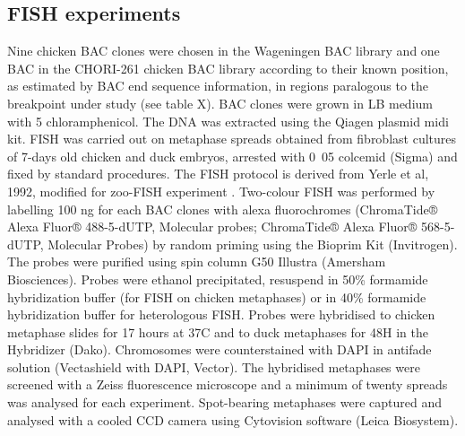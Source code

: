 \documentclass[10pt,letterpaper]{article}
\begin{document}
\subsection*{FISH experiments}

Nine chicken BAC clones were chosen in the Wageningen BAC library \cite{Crooijmans2000} and one BAC in the CHORI-261 chicken BAC library \cite{Zimmer1997} according to their known position, as estimated by BAC end sequence information, in regions paralogous to the breakpoint under study (see table X). BAC clones were grown in LB medium with \unit{5}{\micro\gram\per\milli\litre} chloramphenicol. The DNA was extracted using the Qiagen plasmid midi kit.
FISH was carried out on metaphase spreads obtained from fibroblast cultures of 7-days old chicken and duck embryos, arrested with  \unit{0.05}{\micro\gram\per\milli\litre} colcemid (Sigma) and fixed by standard procedures. The FISH protocol is derived from Yerle et al, 1992, modified for zoo-FISH experiment \cite{Fillon2007}. Two-colour FISH was performed by labelling 100 ng for each BAC clones with alexa fluorochromes (ChromaTide® Alexa Fluor® 488-5-dUTP, Molecular probes; ChromaTide® Alexa Fluor® 568-5-dUTP, Molecular Probes) by random priming using the Bioprim Kit (Invitrogen). The probes were purified using spin column G50 Illustra (Amersham Biosciences). Probes were ethanol precipitated, resuspend in 50\% formamide hybridization buffer (for FISH on chicken metaphases) or in 40\% formamide hybridization buffer for heterologous FISH. Probes were hybridised to chicken metaphase slides for 17 hours at 37\degree C and to duck metaphases for 48H in the Hybridizer (Dako). Chromosomes were counterstained with DAPI in antifade solution (Vectashield with DAPI, Vector). The hybridised metaphases were screened with a Zeiss fluorescence microscope and a minimum of twenty spreads was analysed for each experiment. Spot-bearing metaphases were captured and analysed with a cooled CCD camera using Cytovision software (Leica Biosystem).





\newpage
\end{document}

